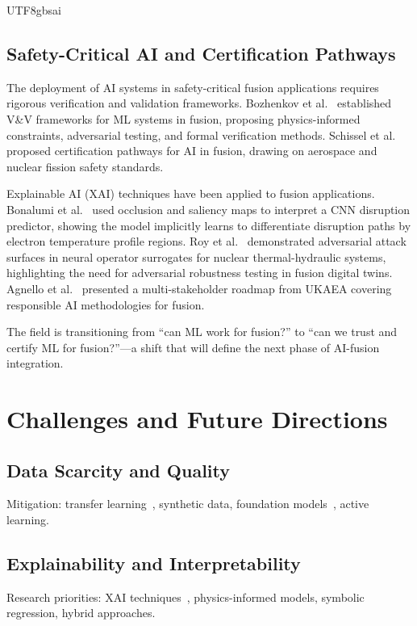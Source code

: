 \documentclass[12pt,a4paper]{article}
\begin{document}
\begin{CJK}{UTF8}{gbsai}
\subsection{Safety-Critical AI and Certification Pathways}

The deployment of AI systems in safety-critical fusion applications requires rigorous verification and validation frameworks. Bozhenkov et al.~\citep{Bozhenkov2024} established V\&V frameworks for ML systems in fusion, proposing physics-informed constraints, adversarial testing, and formal verification methods. Schissel et al.~\citep{Schissel2025} proposed certification pathways for AI in fusion, drawing on aerospace and nuclear fission safety standards.

Explainable AI (XAI) techniques have been applied to fusion applications. Bonalumi et al.~\citep{Bonalumi2024} used occlusion and saliency maps to interpret a CNN disruption predictor, showing the model implicitly learns to differentiate disruption paths by electron temperature profile regions. Roy et al.~\citep{Roy2026Adversarial} demonstrated adversarial attack surfaces in neural operator surrogates for nuclear thermal-hydraulic systems, highlighting the need for adversarial robustness testing in fusion digital twins. Agnello et al.~\citep{Agnello2026} presented a multi-stakeholder roadmap from UKAEA covering responsible AI methodologies for fusion.

The field is transitioning from ``can ML work for fusion?'' to ``can we trust and certify ML for fusion?''---a shift that will define the next phase of AI-fusion integration.

\section{Challenges and Future Directions}

\subsection{Data Scarcity and Quality}

Mitigation: transfer learning~\citep{Reinke2024}, synthetic data, foundation models~\citep{Zhu2025}, active learning.

\subsection{Explainability and Interpretability}

Research priorities: XAI techniques~\citep{Klepper2024}, physics-informed models, symbolic regression, hybrid approaches.


\end{CJK}
\end{document}
